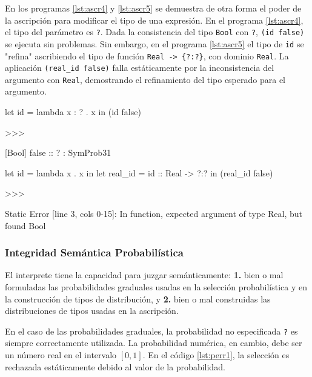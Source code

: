 En los programas \ref{lst:ascr4} y \ref{lst:ascr5} se demuestra
de otra forma el poder de la ascripción para
modificar el tipo de una expresión. En el programa
\ref{lst:ascr4}, el tipo del parámetro es \lstinline|?|. Dada la
consistencia del tipo \lstinline|Bool| con \lstinline|?|, \lstinline|(id false)|
se ejecuta sin problemas. Sin embargo, en el
programa \ref{lst:ascr5}
el tipo de \lstinline|id| se "refina" ascribiendo el tipo
de función \lstinline|Real -> {?:?}|, con dominio \lstinline|Real|.
La aplicación \lstinline|(real_id false)| falla estáticamente
por la inconsistencia del argumento con \lstinline|Real|,
demostrando el refinamiento del tipo esperado
para el argumento.


\begin{gplcblock}[caption={ascr4},label={lst:ascr4}]
let id = lambda x : ? . x in
(id false) 

>>>

{
	 [Bool] false :: ? : SymProb31 
}  
\end{gplcblock}





\begin{gplcblock}[caption={ascr5},label={lst:ascr5}]
let id = lambda x . x in
let real_id = id :: Real -> {?:?} in
(real_id false)

>>>

Static Error [line 3, cols 0-15]: In function, expected argument of type Real, but found Bool
\end{gplcblock}




\subsubsection{Integridad Semántica Probabilística}

El interprete tiene la capacidad para juzgar semánticamente:
\textbf{1.} bien o mal formuladas las probabilidades graduales usadas
en la selección probabilística y en la construcción de tipos de
distribución, y \textbf{2.} bien o mal construidas las distribuciones
de tipos usadas en la ascripción.

En el caso de las probabilidades graduales, la probabilidad no
especificada \lstinline|?| es siempre correctamente utilizada. La
probabilidad numérica, en cambio, debe ser un número real en el intervalo $[0,1]$. En el código \ref{lst:perr1}, la selección es rechazada estáticamente
debido al valor de la probabilidad.

